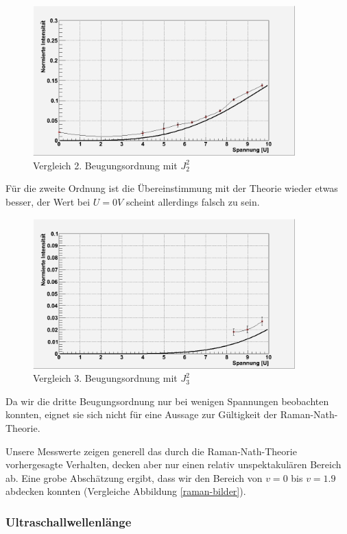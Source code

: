 \begin{figure}[H]
 \includegraphics[width=0.9\textwidth]{Bilder/raman/raman-fit_2.png}
 \caption{Vergleich 2. Beugungsordnung mit $J_2^2$}
\end{figure}
Für die zweite Ordnung ist die Übereinstimmung mit der Theorie wieder etwas besser, der Wert bei $U=0V$ scheint allerdings falsch zu sein.
\begin{figure}[H]
 \includegraphics[width=0.9\textwidth]{Bilder/raman/raman-fit_3.png}
 \caption{Vergleich 3. Beugungsordnung mit $J_3^2$}
\end{figure}
Da wir die dritte Beugungsordnung nur bei wenigen Spannungen beobachten konnten, eignet sie sich nicht für eine Aussage zur Gültigkeit der Raman-Nath-Theorie.

Unsere Messwerte zeigen generell das durch die Raman-Nath-Theorie vorhergesagte Verhalten, decken aber nur einen relativ unspektakulären Bereich ab. Eine grobe Abschätzung ergibt, dass wir den Bereich von $v=0$ bis $v=1.9$ abdecken konnten (Vergleiche Abbildung \ref{raman-bilder}).

\subsubsection{Ultraschallwellenlänge}

